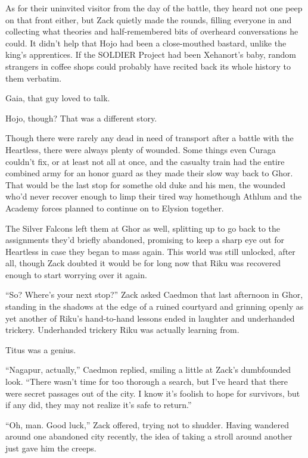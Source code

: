 As for their uninvited visitor from the day of the battle, they heard not one peep on that front either, but Zack quietly made the rounds, filling everyone in and collecting what theories and half-remembered bits of overheard conversations he could. It didn't help that Hojo had been a close-mouthed bastard, unlike the king's apprentices. If the SOLDIER Project had been Xehanort's baby, random strangers in coffee shops could probably have recited back its whole history to them verbatim.

Gaia, that guy loved to talk.

Hojo, though? That was a different story.

Though there were rarely any dead in need of transport after a battle with the Heartless, there were always plenty of wounded. Some things even Curaga couldn't fix, or at least not all at once, and the casualty train had the entire combined army for an honor guard as they made their slow way back to Ghor. That would be the last stop for some\textemdash the old duke and his men, the wounded who'd never recover enough to limp their tired way home\textemdash though Athlum and the Academy forces planned to continue on to Elysion together.

The Silver Falcons left them at Ghor as well, splitting up to go back to the assignments they'd briefly abandoned, promising to keep a sharp eye out for Heartless in case they began to mass again. This world was still unlocked, after all, though Zack doubted it would be for long now that Riku was recovered enough to start worrying over it again.

``So? Where's your next stop?'' Zack asked Caedmon that last afternoon in Ghor, standing in the shadows at the edge of a ruined courtyard and grinning openly as yet another of Riku's hand-to-hand lessons ended in laughter and underhanded trickery. Underhanded trickery Riku was actually learning from.

Titus was a genius.

``Nagapur, actually,'' Caedmon replied, smiling a little at Zack's dumbfounded look. ``There wasn't time for too thorough a search, but I've heard that there were secret passages out of the city. I know it's foolish to hope for survivors, but if any did, they may not realize it's safe to return.''

``Oh, man. Good luck,'' Zack offered, trying not to shudder. Having wandered around one abandoned city recently, the idea of taking a stroll around another just gave him the creeps.

